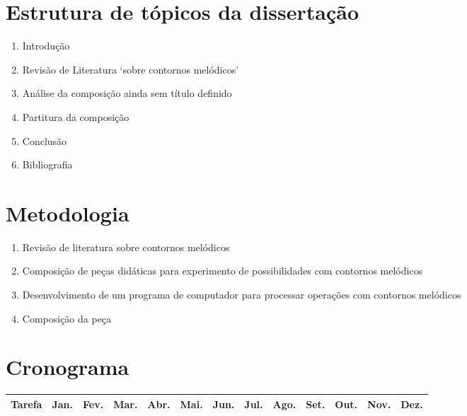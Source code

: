 \documentclass{article}
\begin{document}
\section{Estrutura de tópicos da dissertação}
\label{sec:estrutura-de-topicos}

\begin{enumerate}
\item Introdução
\item Revisão de Literatura `sobre contornos melódicos'
\item Análise da composição ainda sem título definido
\item Partitura da composição
\item Conclusão
\item Bibliografia
\end{enumerate}

\section{Metodologia}
\label{sec:metodologia}

\begin{enumerate}
\item Revisão de literatura sobre contornos melódicos
\item Composição de peças didáticas para experimento de possibilidades
  com contornos melódicos
\item Desenvolvimento de um programa de computador para processar
  operações com contornos melódicos
\item Composição da peça
\end{enumerate}

\section{Cronograma}
\label{sec:cronograma}

\begin{table}[h]
  \centering
  \begin{tabular}{lllllllllllll}
    \hline
    Tarefa & Jan. & Fev. & Mar. & Abr. & Mai. & Jun. & Jul. & Ago. & Set. &
    Out. & Nov. & Dez. \\
    \hline


    \hline
  \end{tabular}
  \label{tab:cronograma}
\end{table}


\renewcommand{\refname}{Bibliografia}
\end{document}
